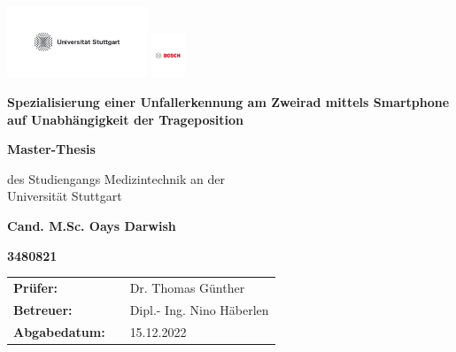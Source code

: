 \relax
\begin{center}
	\begin{center}
			\includegraphics[height=2.1cm]{Bilder/Logos/unistuttgart_logo_deutsch.pdf} \hfill \includegraphics[height=1.3cm]{Bilder/Logos/BoschLogotype2.pdf}
	\end{center}
	\vspace*{2.5cm} 
	\begin{center}
		\LARGE\textbf{Spezialisierung einer Unfallerkennung am Zweirad mittels Smartphone auf Unabhängigkeit der Trageposition}
	\end{center}
	\vspace{2.5cm}
	
	\begin{center}
		\textbf{Master-Thesis}
	\end{center}
	\vspace{1cm}
	
	\begin{center}
		des Studiengangs Medizintechnik an der\\
		Universität Stuttgart
	\end{center}
	\vspace{1.8cm}
	\begin{center}
		\textbf{Cand. M.Sc. Oays Darwish} 
	\end{center}	
	
	\begin{center}
		\textbf{3480821}
	\end{center}
	\vspace{2.5cm}
	\begin{center}
		\begin{tabular}{lll}
			\textbf{Prüfer: }&& Dr. Thomas Günther\\
			\textbf{Betreuer:}&& Dipl.- Ing. Nino Häberlen \\
			\textbf{Abgabedatum: }&& 15.12.2022\\
		\end{tabular}
	\end{center}	
	
\end{center}